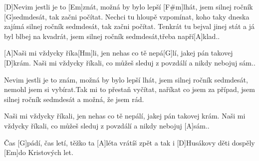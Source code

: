 
[D]Nevim jestli je to [Em]znát, možná by bylo lepší [F#m]lhát, jsem silnej ročník [G]sedmdesát, tak začni počítat.
Nechci tu hloupě vzpomínat, koho taky dneska zajímá silnej ročník sedmdesát, tak začni počítat.
Tenkrát tu bejval jinej stát a já byl blbej na kvadrát, jsem silnej ročník sedmdesát,třeba napří[A]klad..

[A]Naši mi vždycky říka[Hm]li, jen nehas co tě nepá[G]lí, jakej pán takovej [D]krám.
Naši mi vždycky říkali, co můžeš sleduj z povzdálí a nikdy nebojuj sám..

Nevim jestli je to znám, možná by bylo lepší lhát, jsem silnej ročník sedmdesát, nemohl jsem si vybírat.Tak mi to přestaň vyčítat, naříkat co jsem za případ, jsem silnej ročník sedmdesát a možná, že jsem rád.

Naši mi vždycky říkali, jen nehas co tě nepálí, jakej pán takovej krám.
Naši mi vždycky říkali, co můžeš sleduj z povzdálí a nikdy nebojuj [A]sám..

Čas [G]pádí, čas letí, těžko ta [A]léta vrátíš zpět 
a tak i [D]Husákovy děti dospěly [Em]do Kristových let.


